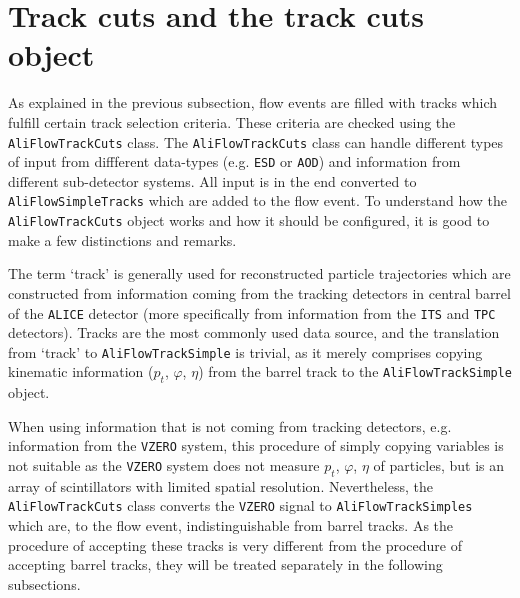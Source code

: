 \documentclass[a4paper]{book}
\numberwithin{equation}{subsection}
\begin{document}
\section{Track cuts and the track cuts object}
As explained in the previous subsection, flow events are filled with tracks which fulfill certain track selection criteria. These criteria are checked using the \texttt{AliFlowTrackCuts} class. The \texttt{AliFlowTrackCuts} class can handle different types of input from diffferent data-types (e.g. \texttt{ESD} or \texttt{AOD}) and information from different sub-detector systems. All input is in the end converted to \texttt{AliFlowSimpleTracks} which are added to the flow event. To understand how the \texttt{AliFlowTrackCuts} object works and how it should be configured, it is good to make a few distinctions and remarks. 

The term `track' is generally used for reconstructed particle trajectories which are constructed from information coming from the tracking detectors in central barrel of the \texttt{ALICE} detector (more specifically from information from the \texttt{ITS} and \texttt{TPC} detectors). Tracks are the most commonly used data source, and the translation from `track' to \texttt{AliFlowTrackSimple} is trivial, as it merely comprises copying  kinematic information ($p_t$, $\varphi$, $\eta$) from the barrel track to the \texttt{AliFlowTrackSimple} object. 

When using information that is not coming from tracking detectors, e.g. information from the \texttt{VZERO} system, this procedure of simply copying variables is not suitable as the \texttt{VZERO} system does not measure $p_t$, $\varphi$, $\eta$ of particles, but is an array of scintillators with limited spatial resolution. Nevertheless, the \texttt{AliFlowTrackCuts} class converts the \texttt{VZERO} signal to \texttt{AliFlowTrackSimples} which are, to the flow event, indistinguishable from barrel tracks. As the procedure of accepting these tracks is very different from the procedure of accepting barrel tracks, they will be treated separately in the following subsections. 
\end{document}
